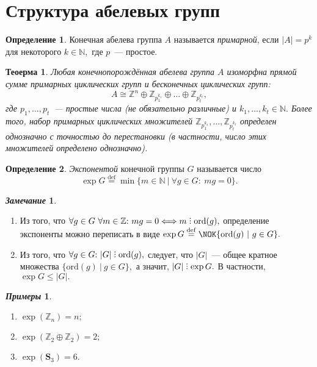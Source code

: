 \documentclass[a4paper, 14pt]{extarticle}
\newcommand{\deq}{\stackrel{\mathrm{def}}{=}}
\newcommand{\integers}{\mathbb{Z}}
\newcommand{\naturals}{\mathbb{N}}
\newcommand{\symmetrical}{\mathbf{S}}
\newcommand{\ord}{\mathrm{ord}}
\DeclareRobustCommand{\divby}{%
	\mathrel{\text{\vbox{\baselineskip.65ex\lineskiplimit0pt\hbox{.}\hbox{.}\hbox{.}}}}%
}
\theoremstyle{definition}
\newtheorem*{exmpls}{\textit{Примеры}}
\newtheorem*{remark}{\textit{Замечание}}
\newtheorem{definition}{Определение}
\theoremstyle{plain}
\newtheorem{theorem}{Теоерма}
\numberwithin{theorem}{section}
\numberwithin{definition}{section}
\numberwithin{statement}{section}
\numberwithin{lemma}{section}
\numberwithin{consequence}{section}
\begin{document}
        \section{Структура абелевых групп}
        \setcounter{definition}{0}
	\begin{definition}
		Конечная абелева группа $A$ называется \textit{примарной}, если ${|A| = p^k}$ для некоторого ${k \in \naturals,}$ где $p$~--- простое.
	\end{definition}
	\begin{theorem}
        Любая конечнопорождённая абелева группа $A$
        изоморфна прямой сумме примарных циклических групп и бесконечных циклических групп: 
        \begin{equation*}
            A \cong \integers^n \oplus \integers_{p^{k_1}_1} \oplus \ldots \oplus \integers_{p^{k_t}_t},
        \end{equation*}
        где ${p_1, \ldots, p_t}$~--- простые числа (не обязательно различные) и ${k_1, \ldots, k_t \in \naturals.}$ Более того, набор примарных циклических множителей ${\integers_{p^{k_1}_1}, \ldots, \integers_{p^{k_t}_t}}$ определен однозначно с точностью до перестановки (в частности, число этих множителей определено однозначно).
	\end{theorem}
	\begin{definition}
		\textit{Экспонентой} конечной группы $G$ называется число
		\begin{equation*}
			\exp G \deq \min \{m \in \naturals \ | \ \forall g \in G{:} \ mg = 0\}.
		\end{equation*}
	\end{definition}
	\begin{remark}
		\
		\begin{enumerate}
			\setlength\itemsep{0.1em}
			\item Из того, что ${\forall g \in G \  \forall m \in \integers{:} \ mg = 0 \Longleftrightarrow m \divby \ord(g),}$ определение экспоненты можно переписать в виде ${\exp G \deq \NOK \{\ord(g) \ | \ g \in G\}.}$
			\item Из того, что ${\forall g \in G{:} \ |G| \divby \ord(g),}$ следует, что $|G|$~--- общее кратное
			множества ${\{\ord(g) \ | \ g \in G\},}$ а значит, ${|G| \divby \exp G.}$ В частности,
			${\exp G \leqslant |G|.}$
		\end{enumerate}
	\end{remark}
        \begin{exmpls}
            \
            \begin{enumerate}
            \setlength\itemsep{0.1em}
                \item $\exp(\integers_n) = n;$
                \item $\exp(\integers_2 \oplus \integers_2) = 2;$
                \item $\exp(\symmetrical_3) = 6.$
            \end{enumerate}
        \end{exmpls}
\end{document}
